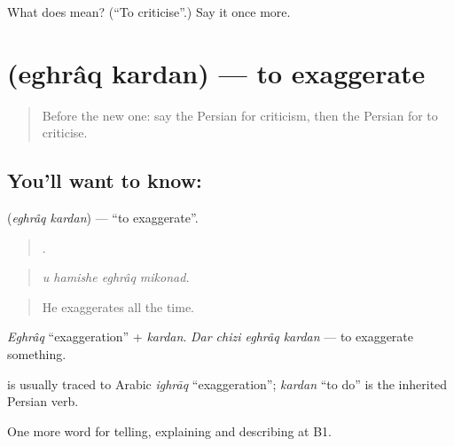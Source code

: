 \begin{tcolorbox}[breakable,colback=teal!4,colframe=teal!35!black,title={Before you move on}]
What does   mean? (\textquotedblleft{}To criticise\textquotedblright{}.) Say it once more.
\end{tcolorbox}
\section[\texorpdfstring{\fa{اغراق} \fa{کردن} (eghrâq kardan)}{اغراق کردن (eghrâq kardan)}]{  (eghrâq kardan) — to exaggerate}

\label{lesson:FA-C365-eghraq-kardan}



\begin{quote}
Before the new one: say the Persian for criticism, then the Persian for to criticise.
\end{quote}

\subsection*{You'll want to know:  }
\textbf{ } (\emph{eghrâq kardan}) — \textquotedblleft{}to exaggerate\textquotedblright{}.

\begin{quote}
   .
\end{quote}

\begin{quote}
\emph{u hamishe eghrâq mikonad.}
\end{quote}

\begin{quote}
He exaggerates all the time.
\end{quote}

\emph{Eghrâq} \textquotedblleft{}exaggeration\textquotedblright{} + \emph{kardan}. \emph{Dar chizi eghrâq kardan} — to exaggerate something.

\begin{cousinweb}
\textbf{} is usually traced to Arabic \emph{ighrāq} \textquotedblleft{}exaggeration\textquotedblright{}; \emph{kardan} \textquotedblleft{}to do\textquotedblright{} is the inherited Persian verb.
\end{cousinweb}

\begin{grammarlens}[title={What you've built}]
One more word for telling, explaining and describing at B1.
\end{grammarlens}

